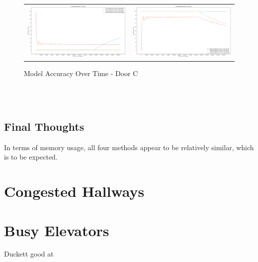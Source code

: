 \begin{figure}
  \begin{tabular}{cc}
    {\includegraphics[width = 3in]{images/results/Future_Predictions_on_door_C.png}} &
    {\includegraphics[width = 3in]{images/results/Historical_Predictions_on_door_C.png}} \\
  \end{tabular}
  \caption{Model Accuracy Over Time - Door C}
\end{figure}\\ \\

\subsection{ Final Thoughts }
In terms of memory usage, all four methods appear to be relatively similar, which is to be expected.

\section{ Congested Hallways }

\section{ Busy Elevators }


Duckett good at

